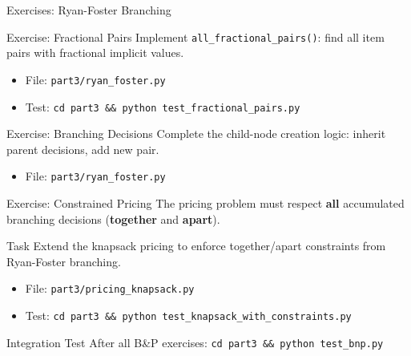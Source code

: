 \documentclass[aspectratio=169]{beamer}
\begin{document}
\begin{frame}{Exercises: Ryan-Foster Branching}
\begin{block}{Exercise: Fractional Pairs}
Implement \texttt{all\_fractional\_pairs()}: find all item pairs with fractional implicit values.
\end{block}
\begin{itemize}
  \item File: \texttt{part3/ryan\_foster.py}
  \item Test: \texttt{cd part3 \&\& python test\_fractional\_pairs.py}
\end{itemize}

\medskip
\begin{block}{Exercise: Branching Decisions}
Complete the child-node creation logic: inherit parent decisions, add new pair.
\end{block}
\begin{itemize}
  \item File: \texttt{part3/ryan\_foster.py}
\end{itemize}
\end{frame}

\begin{frame}{Exercise: Constrained Pricing}
The pricing problem must respect \textbf{all} accumulated branching decisions
(\textbf{together} and \textbf{apart}).

\medskip
\begin{block}{Task}
Extend the knapsack pricing to enforce together/apart constraints
from Ryan-Foster branching.
\end{block}
\begin{itemize}
  \item File: \texttt{part3/pricing\_knapsack.py}
  \item Test: \texttt{cd part3 \&\& python test\_knapsack\_with\_constraints.py}
\end{itemize}

\medskip
\begin{block}{Integration Test}
After all B\&P exercises: \texttt{cd part3 \&\& python test\_bnp.py}
\end{block}
\end{frame}
\end{document}
